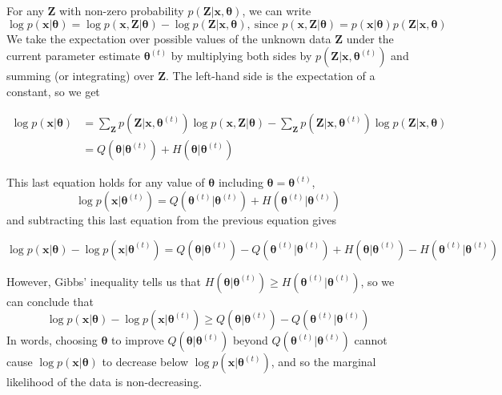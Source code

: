 For any  $\mathbf{Z}$  with non-zero probability   $p(\mathbf{Z}|\boldsymbol x,\boldsymbol\theta)$, we can write
\[
	\log p(\boldsymbol x|\boldsymbol\theta) = \log p(\boldsymbol x,\mathbf{Z}|\boldsymbol\theta) - \log p(\mathbf{Z}|\boldsymbol x,\boldsymbol\theta),~\text{since }p(\boldsymbol x,\mathbf{Z}|\boldsymbol\theta) =p(\boldsymbol x|\boldsymbol\theta) p(\mathbf{Z}|\boldsymbol x,\boldsymbol\theta)
\]
We take the expectation over possible values of the unknown data  $\mathbf{Z}$  under the current parameter estimate $\boldsymbol\theta^{(t)}$ by multiplying both sides by $p(\mathbf{Z}| \boldsymbol x,\boldsymbol\theta^{(t)})$ and summing (or integrating) over $\mathbf{Z}$. The left-hand side is the expectation of a constant, so we get
\begin{scriptsize}
\begin{align*}
	\log p(\boldsymbol x|\boldsymbol\theta) &
	= \sum_{\mathbf{Z}} p(\mathbf{Z}|\boldsymbol x,\boldsymbol\theta^{(t)}) \log p(\boldsymbol x,\mathbf{Z}|\boldsymbol\theta)
	- \sum_{\mathbf{Z}} p(\mathbf{Z}|\boldsymbol x,\boldsymbol\theta^{(t)}) \log p(\mathbf{Z}|\boldsymbol x,\boldsymbol\theta) \\
	& = Q(\boldsymbol\theta|\boldsymbol\theta^{(t)}) + H(\boldsymbol\theta|\boldsymbol\theta^{(t)})
\end{align*}
\end{scriptsize}
This last equation holds for any value of $\boldsymbol {\theta}$ including 
$\boldsymbol \theta = \boldsymbol\theta^{(t)}$,
\[
	\log p(\boldsymbol x|\boldsymbol\theta^{(t)})
	= Q(\boldsymbol\theta^{(t)}|\boldsymbol\theta^{(t)}) + H(\boldsymbol\theta^{(t)}|\boldsymbol\theta^{(t)})
\]
and subtracting this last equation from the previous equation gives
\begin{scriptsize}
\[
	\log p(\boldsymbol x|\boldsymbol\theta) - \log p(\boldsymbol x|\boldsymbol\theta^{(t)})
	= Q(\boldsymbol\theta|\boldsymbol\theta^{(t)}) - Q(\boldsymbol\theta^{(t)}|\boldsymbol\theta^{(t)}) +H(\boldsymbol\theta|\boldsymbol\theta^{(t)})-H(\boldsymbol\theta^{(t)}|\boldsymbol\theta^{(t)})
\]
\end{scriptsize}
However, Gibbs' inequality tells us that $H(\boldsymbol\theta|\boldsymbol\theta^{(t)}) \ge H(\boldsymbol\theta^{(t)}|\boldsymbol\theta^{(t)})$, so we can conclude that
\[
	\log p(\boldsymbol x|\boldsymbol\theta) - \log p(\boldsymbol x|\boldsymbol\theta^{(t)})
	\ge Q(\boldsymbol\theta|\boldsymbol\theta^{(t)}) - Q(\boldsymbol\theta^{(t)}|\boldsymbol\theta^{(t)})
\]
In words, choosing  $\boldsymbol {\theta}$ to improve $Q(\boldsymbol\theta|\boldsymbol\theta^{(t)})$ beyond $Q(\boldsymbol\theta^{(t)}|\boldsymbol\theta^{(t)})$ cannot cause $\log p(\boldsymbol x|\boldsymbol\theta)$ to decrease below $\log p(\boldsymbol x|\boldsymbol\theta^{(t)})$, and so the marginal likelihood of the data is non-decreasing.

